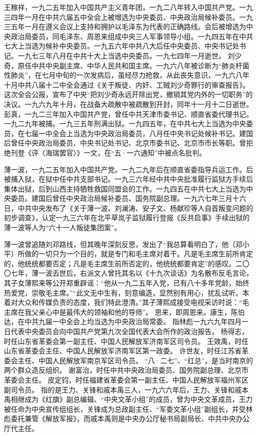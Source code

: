 \begin{maonote}
王稼祥，一九二五年加入中国共产主义青年团，一九二八年转入中国共产党。一九三四年一月在中共六届五中全会上被增选为中央委员、中央政治局候补委员。一九三五年一月在遵义会议上支持和拥护以毛泽东为代表的正确路线。会后被增选为中央政治局委员，同毛泽东、周恩来组成中央三人军事领导小组。一九四五年在中共七大上当选为候补中央委员。一九五六年中共八大后任中央委员、中央书记处书记。一九七三年八月在中共十大上当选中央委员。一九七四年一月逝世。
刘少奇，原任中共中央副主席、中华人民共和国主席。一九六八年被诊断为“肺炎杆菌性肺炎”，在七月中旬的一次发病后，虽经尽力抢救，从此丧失意识，一九六八年十月中共八届十二中全会通过《关于叛徒、内奸、工贼刘少奇罪行的审查报告》。这次全会公报，宣布了中央“把刘少奇永远开除出党，撤销其党内外的一切职务”的决议。一九六九年十月，在战备大疏散中被疏散到开封，同年十一月十二日逝世。
彭真，一九二三年加入中国共产党，曾任中共天津市委书记、顺直省委代理书记。一九二九年被捕。一九三五年刑满出狱。一九四五年，在中共七大上当选为中央委员，在七届一中全会上当选为中央政治局委员，八月任中央书记处候补书记。建国后曾任中央政治局委员、中央书记处书记、北京市委书记、北京市市长等职。曾拒绝刊登《评〈海瑞罢官〉》一文，在“五·一六通知”中被点名批判。

薄一波，一九二五年加入中国共产党。一九二九年后在顺直省委指导兵运工作。后被捕入狱，在狱中任中共支部书记。一九三六年经中共中央批准履行监狱方手续后集体出狱，后到山西主持牺牲救国同盟会的工作。一九四五在中共七大上当选为中央委员。建国后曾任中央政治局候补委员、国务院副总理。一九六七年三月十六日，中共中央发布了《关于薄一波、刘澜涛、安子文、杨献珍等人自首叛变问题的初步调查》，认定一九三六年在北平草岚子监狱履行登报《反共启事》手续出狱的薄一波等人为“六十一人叛徒集团案”。

薄一波曾追随刘邓路线，但其晚年深刻反思，发出了“我总算看明白了，他（邓小平）所做的一切只为一个目的，就是专门和毛主席对着干。凡是毛主席生前所肯定的，他统统都要否定；凡是毛主席生前所否定的，他统统都要肯定”的感叹。二〇〇七年，薄一波去世后，右派文人曾托其名以《十九次谈话》为名散布反毛言论，其子女薄熙来等公开郑重辟谣：“他从一九二五年入党，已有八十多年党龄，始终热爱党，崇敬毛主席。”“此文无中生有，刻意编造，显然别有用心，扰乱试听。本着对大众和传媒负责的态度，我们特此澄清。”其子薄熙成接受电视采访时说：“毛主席在我父亲心中是最伟大的领袖和他的导师”。
恩来，即周恩来。康生，陈伯达，在中共九届一中全会上均当选为中央政治局常委。
指林彪一九六九年四月一日代表中央委员会向中国共产党第九次全国代表大会所作的政治报告。
杨得志，时任山东省革委会第一副主任、中国人民解放军济南军区司令员。
王效禹，时任山东省革委会主任、中国人民解放军济南军区第一政委。
许世友，时任江苏省革委会主任、中国人民解放军南京军区司令员。
“八·二七”、“红总”，是当时南京的两个群众造反组织。
谢富治，时任中共中央政治局委员、国务院副总理、北京市革委会主任。
皮定钧，时任福建省革委会第一副主任、中国人民解放军福州军区副司令员。
指的是王力、关锋和戚本禹三人，一九六六年后，王力、关锋和戚本禹相继成为《红旗》副总编辑、“中央文革小组”的成员，曾为中央文革成员，王力被任命为中央宣传组组长，关锋成为总政副主任、“军委文革小组”副组长，并受林彪委托兼管《解放军报》，而戚本禹则是中央办公厅秘书局副局长、中共中央办公厅代主任。


\end{maonote}

